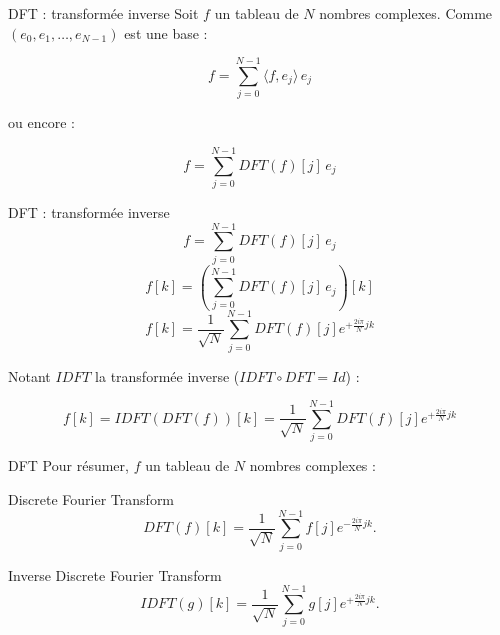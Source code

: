 \begin{frame}{DFT : transformée inverse}
Soit $f$ un tableau de $N$ nombres complexes.
Comme $(e_0,e_1,\dots, e_{N-1})$ est une base :

\[f = \sum_{j=0}^{N-1} \langle f,e_j \rangle \, e_j\]

ou encore :

\[f = \sum_{j=0}^{N-1} DFT(f)[j] \, e_j\]

\end{frame}
\begin{frame}{DFT : transformée inverse}
\[f = \sum_{j=0}^{N-1} DFT(f)[j] \, e_j\]
\[f[k] = \left( \sum_{j=0}^{N-1} DFT(f)[j] \, e_j \right) [k] \]
\[f[k] = 
\frac{1}{\sqrt{N}}  \sum_{j=0}^{N-1} DFT(f)[j] e^{+\frac{2i\pi}{N} jk}  \]

Notant $IDFT$ la transformée inverse ($IDFT\circ DFT = Id$) :

\[f[k] =  IDFT(DFT(f))[k] = \frac{1}{\sqrt{N}}  \sum_{j=0}^{N-1} DFT(f)[j] e^{+\frac{2i\pi}{N} jk} \]
\end{frame}

\begin{frame}{DFT}
Pour résumer, $f$ un tableau de $N$ nombres complexes :
\begin{alertblock}{Discrete Fourier Transform}
\[DFT(f)[k] =  \frac{1}{\sqrt{N}}\sum_{j=0}^{N-1}f[j]e^{-\frac{2i\pi}{N} jk}.\]
\end{alertblock}
\begin{alertblock}{Inverse Discrete Fourier Transform}
\[IDFT(g)[k] =  \frac{1}{\sqrt{N}}\sum_{j=0}^{N-1}g[j]e^{+\frac{2i\pi}{N} jk}.\]
\end{alertblock}
\end{frame}

